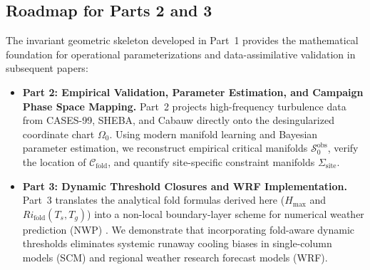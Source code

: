 \subsection{Roadmap for Parts 2 and 3}

The invariant geometric skeleton developed in Part~1 provides the mathematical foundation for operational parameterizations and data-assimilative validation in subsequent papers:

\begin{itemize}
    \item \textbf{Part 2: Empirical Validation, Parameter Estimation, and Campaign Phase Space Mapping.}
    Part~2 projects high-frequency turbulence data from CASES-99, SHEBA, and Cabauw directly onto the desingularized coordinate chart $\Omega_0$. Using modern manifold learning and Bayesian parameter estimation, we reconstruct empirical critical manifolds $\mathcal{S}_0^{\mathrm{obs}}$, verify the location of $\mathcal{C}_{\mathrm{fold}}$, and quantify site-specific constraint manifolds $\Sigma_{\mathrm{site}}$.

    \item \textbf{Part 3: Dynamic Threshold Closures and WRF Implementation.}
    Part~3 translates the analytical fold formulas derived here ($H_{\max}$ and $Ri_{\mathrm{fold}}(T_s, T_g)$) into a non-local boundary-layer scheme for numerical weather prediction (NWP) \citep{Holtslag2013}. We demonstrate that incorporating fold-aware dynamic thresholds eliminates systemic runaway cooling biases in single-column models (SCM) and regional weather research forecast models (WRF).
\end{itemize}